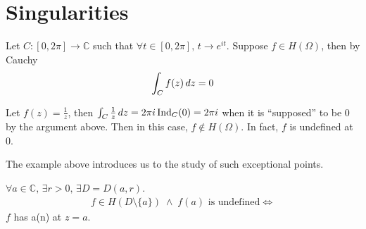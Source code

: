 \documentclass[11pt, oneside]{book}
\begin{document}
\section{Singularities} %
\label{sec:singularities}

\begin{ex}
	Let $C : [0, 2 \pi] \to \mathbb{C}$ such that $\forall t \in [0, 2 \pi], \, t \to e^{it}$. Suppose $f \in H(\Omega)$, then by Cauchy
	\begin{equation*}
		\int_{C} f(z) \dif{z} = 0
	\end{equation*}

	Let $f(z) = \frac{1}{z}$, then $\int_{C} \frac{1}{z} \dif{z} = 2 \pi i \ind{0}{C} = 2 \pi i$ when it is ``supposed'' to be $0$ by the argument above. Then in this case, $f \notin H(\Omega)$. In fact, $f$ is undefined at $0$.
\end{ex}

The example above introduces us to the study of such exceptional points.

\begin{defn}\label{defn:singularity}
	$\forall a \in \mathbb{C}, \, \exists r > 0 , \, \exists D = D(a, r)$.
	\begin{gather*}
		f \in H(D \setminus \{a\}) \; \land \; f(a) \text{ is undefined} \iff
	\end{gather*}
	$f$ has a(n)  at $z = a$.
\end{defn}
\end{document}
